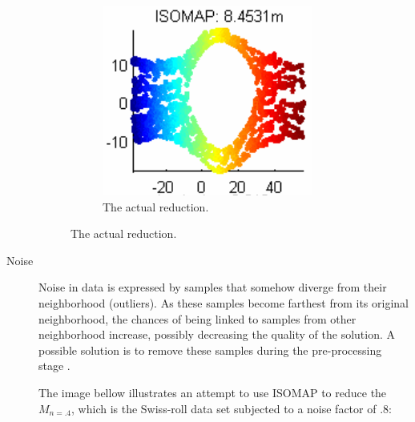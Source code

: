 \documentclass[12pt]{report}
\begin{document}
\begin{description}
\begin{figure}[H]
		\begin{subfigure}[H]{.45\linewidth}
			\includegraphics[width=\linewidth]{img/convexity/actual.png}
			\captionsetup{justification=centering}
			\caption{The actual reduction.}
		\end{subfigure}
	\end{figure}

	\newpage
	\item[Noise] Noise in data is expressed by samples that somehow diverge from their neighborhood (outliers). As these samples become farthest from its original neighborhood, the chances of being linked to samples from other neighborhood increase, possibly decreasing the quality of the solution. A possible solution is to remove these samples during the pre-processing stage \cite{herik2009}.

	The image bellow illustrates an attempt to use ISOMAP to reduce the $M_{n=.4}$, which is the Swiss-roll data set subjected to a noise factor of $.8$:


\end{description}
\end{document}
